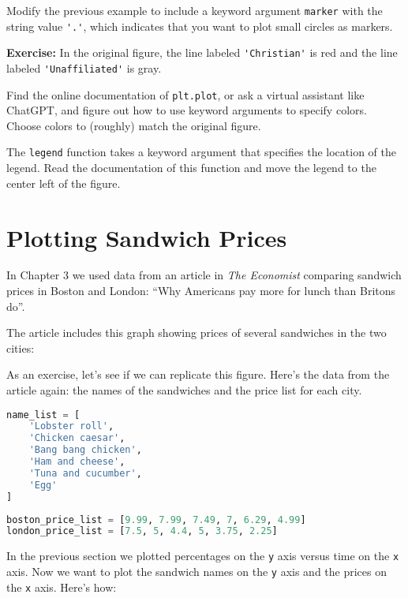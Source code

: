 Modify the previous example to include a keyword argument
\passthrough{\lstinline!marker!} with the string value
\passthrough{\lstinline!'.'!}, which indicates that you want to plot
small circles as markers.

\textbf{Exercise:} In the original figure, the line labeled
\passthrough{\lstinline!'Christian'!} is red and the line labeled
\passthrough{\lstinline!'Unaffiliated'!} is gray.

Find the online documentation of \passthrough{\lstinline!plt.plot!}, or
ask a virtual assistant like ChatGPT, and figure out how to use keyword
arguments to specify colors. Choose colors to (roughly) match the
original figure.

The \passthrough{\lstinline!legend!} function takes a keyword argument
that specifies the location of the legend. Read the documentation of
this function and move the legend to the center left of the figure.

\hypertarget{plotting-sandwich-prices}{%
\section{Plotting Sandwich Prices}\label{plotting-sandwich-prices}}

In Chapter 3 we used data from an article in \emph{The Economist}
comparing sandwich prices in Boston and London: ``Why Americans pay more
for lunch than Britons do''.

The article includes this graph showing prices of several sandwiches in
the two cities:

As an exercise, let's see if we can replicate this figure. Here's the
data from the article again: the names of the sandwiches and the price
list for each city.

\begin{lstlisting}[language=Python,style=source]
name_list = [
    'Lobster roll',
    'Chicken caesar',
    'Bang bang chicken',
    'Ham and cheese',
    'Tuna and cucumber',
    'Egg'
]
\end{lstlisting}

\begin{lstlisting}[language=Python,style=source]
boston_price_list = [9.99, 7.99, 7.49, 7, 6.29, 4.99]
london_price_list = [7.5, 5, 4.4, 5, 3.75, 2.25]
\end{lstlisting}

In the previous section we plotted percentages on the
\passthrough{\lstinline!y!} axis versus time on the
\passthrough{\lstinline!x!} axis. Now we want to plot the sandwich names
on the \passthrough{\lstinline!y!} axis and the prices on the
\passthrough{\lstinline!x!} axis. Here's how:


